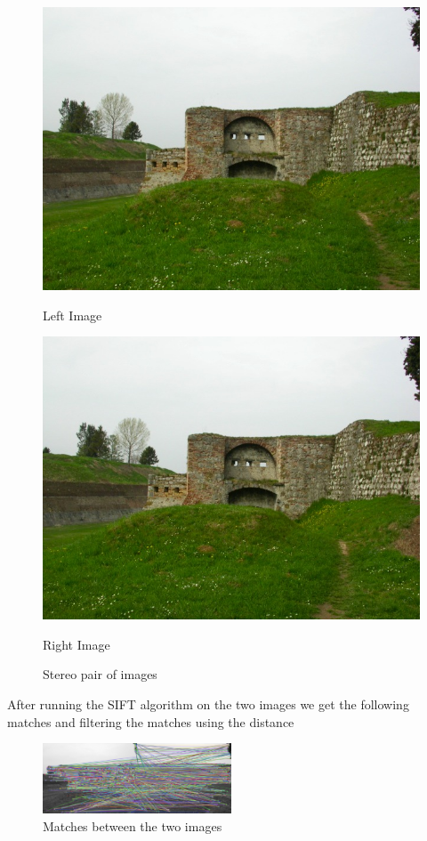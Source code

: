 \documentclass[10pt,twocolumn,letterpaper]{article}
\begin{document}
\begin{figure}
    \centering
    \begin{minipage}[t]{0.32\textwidth}
    \centerline{\includegraphics[width=\textwidth]{im1.jpg}}
    \centerline{Left Image}
    \end{minipage}
    \hfill
    \begin{minipage}[t]{0.32\textwidth}   
    \centerline{\includegraphics[width=\textwidth]{im2.jpg}}
    \centerline{Right Image}
    \end{minipage}
    \caption{Stereo pair of images}
    \label{fig:stereo pair}
\end{figure}

After running the SIFT algorithm on the two images we get the following matches and filtering the matches using the distance 
\begin{figure}
    \centering
    \includegraphics[width=0.5\textwidth]{sift.png}
    \caption{Matches between the two images}
    \label{fig:matches}
\end{figure}
\end{document}
